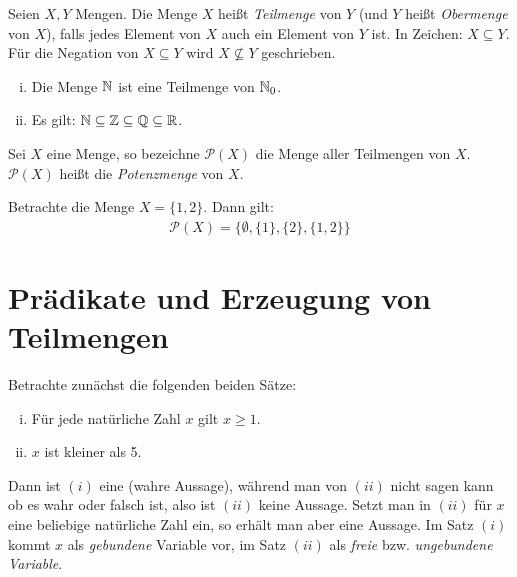 \begin{mydef}
    Seien $X,Y$ Mengen. Die Menge $X$ heißt \textit{Teilmenge} von $Y$ (und $Y$ heißt \textit{Obermenge} von $X$), 
    falls jedes Element von $X$ auch ein Element von $Y$ ist. In Zeichen: $X \subseteq Y$. Für die  Negation von $X \subseteq Y$ wird 
    $X \nsubseteq Y$ geschrieben. 
\end{mydef}

\begin{example}
    \begin{enumerate}[(i)]
        \item 
        Die Menge $\mathbb{N}$ ist eine Teilmenge von $\mathbb{N}_0$. 
        \item 
        Es gilt: $\mathbb{N} \subseteq \mathbb{Z} \subseteq \mathbb{Q} \subseteq \mathbb{R}$. 
    \end{enumerate}
\end{example}

\begin{mydef}
    Sei $X$ eine Menge, so bezeichne  $\mathcal{P}(X)$ die Menge aller Teilmengen von $X$. 
    $\mathcal{P}(X)$ heißt die \textit{Potenzmenge} von $X$. 
\end{mydef}

\begin{example}
    Betrachte die Menge $X = \{1,2\}$. Dann gilt: 
    \begin{align*}
        \mathcal{P}(X) = \{\emptyset, \{1\}, \{2\}, \{1,2\}\}
    \end{align*}
\end{example}


\section{Prädikate und Erzeugung von Teilmengen}

Betrachte zunächst die folgenden beiden Sätze: 
\begin{enumerate}[(i)]
    \item 
    Für jede natürliche Zahl $x$ gilt $x \geq 1$. 
    \item 
    $x$ ist kleiner als 5.
\end{enumerate}

Dann ist $(i)$ eine (wahre Aussage), während man von $(ii)$ nicht sagen kann ob es wahr oder falsch ist, also ist $(ii)$ keine Aussage. 
Setzt man in $(ii)$ für $x$ eine beliebige natürliche Zahl ein, so erhält man aber eine Aussage. Im Satz $(i)$ kommt $x$ als \textit{gebundene} Variable vor, 
im Satz $(ii)$ als \textit{freie} bzw. \textit{ungebundene Variable}. 

